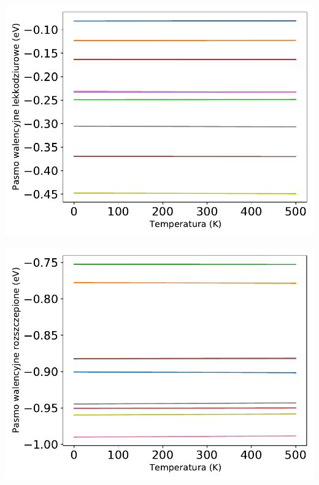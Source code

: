 \documentclass[12pt,openany,a4paper]{book}
\begin{document}
\begin{minipage}[t]{0.5\textwidth}
	\includegraphics[width = \linewidth]{Figures/strain/Ev_lh1.pdf}\label{fig:Ev_lh1}
\end{minipage}
\begin{minipage}[t]{0.5\textwidth}
	\includegraphics[width = \linewidth]{Figures/strain/Ev_sh1.pdf}\label{fig:Ev_sh1}
\end{minipage}
\begin{center}
\label{fig:bands1}
\end{center}
\end{document}
